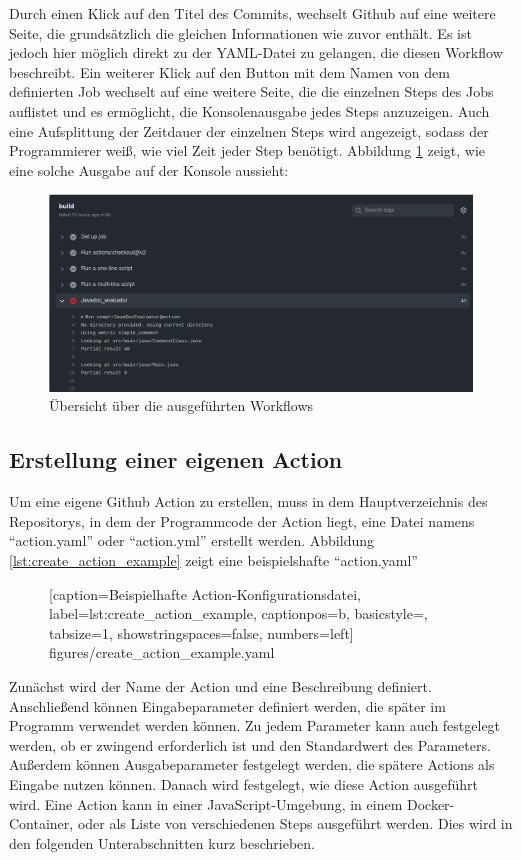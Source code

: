 	Durch einen Klick auf den Titel des Commits, wechselt Github auf eine weitere Seite, die grundsätzlich die gleichen Informationen wie zuvor enthält. Es ist jedoch hier möglich direkt zu der YAML-Datei zu gelangen, die diesen Workflow beschreibt. Ein weiterer Klick auf den Button mit dem Namen von dem definierten Job wechselt auf eine weitere Seite, die die einzelnen Steps des Jobs auflistet und es ermöglicht, die Konsolenausgabe jedes Steps anzuzeigen. Auch eine Aufsplittung der Zeitdauer der einzelnen Steps wird angezeigt, sodass der Programmierer weiß, wie viel Zeit jeder Step benötigt. Abbildung \ref{fig:workflow_output} zeigt, wie eine solche Ausgabe auf der Konsole aussieht:
	\begin{figure}[h]
	    \centering
	    
	    \includegraphics[width=\columnwidth]{figures/workflow_output.png}
	    \caption{Übersicht über die ausgeführten Workflows}
	    \label{fig:workflow_output}
	\end{figure}
\subsection{Erstellung einer eigenen Action}
Um eine eigene Github Action zu erstellen, muss in dem Hauptverzeichnis des Repositorys, in dem der Programmcode der Action liegt, eine Datei namens \enquote{action.yaml} oder \enquote{action.yml} erstellt werden. Abbildung \ref{lst:create_action_example} zeigt eine beispielshafte \enquote{action.yaml}
	\begin{figure}[h!]
			
			[caption={Beispielhafte Action-Konfigurationsdatei},
			label={lst:create_action_example},
			captionpos=b, basicstyle=\footnotesize, tabsize=1, showstringspaces=false,  numbers=left]
			{figures/create_action_example.yaml}
		\end{figure}
Zunächst wird der Name der Action und eine Beschreibung definiert. Anschließend können Eingabeparameter definiert werden, die später im Programm verwendet werden können. Zu jedem Parameter kann auch festgelegt werden, ob er zwingend erforderlich ist und den Standardwert des Parameters. Außerdem können Ausgabeparameter festgelegt werden, die spätere Actions als Eingabe nutzen können. Danach wird festgelegt, wie diese Action ausgeführt wird. Eine Action kann in einer JavaScript-Umgebung, in einem Docker-Container, oder als Liste von verschiedenen Steps ausgeführt werden. Dies wird in den folgenden Unterabschnitten kurz beschrieben.

